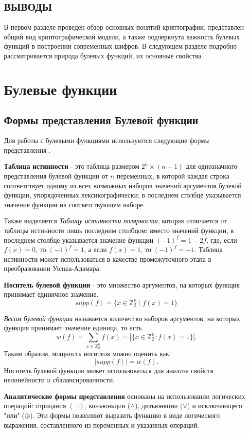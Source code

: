 \subsection*{ВЫВОДЫ}
В первом разделе проведён обзор основных понятий криптографии, представлен общий вид криптографической модели, а также подчеркнута важность булевых функций в построении современных шифров. В следующем разделе подробно рассматривается природа булевых функций, их основные свойства.
\section{Булевые функции}
\subsection{Формы представления Булевой функции}
Для работы с булевыми функциями используются следующие формы представления \cite{Pankratova}.

\textbf{Таблица истинности} - это таблица размером $2^n \times (n + 1)$ для однозначного представления булевой функции от $n$ переменных, в которой каждая строка соответствует одному из всех возможных наборов значений аргументов булевой функции, упорядоченных лексикографически; в последнем столбце указывается значение функции на соответствующем наборе.

Также выделяется \textit{Таблицу истинности полярности}, которая отличается от таблицы истинности лишь последним столбцом: вместо значений функции, в последнем столбце указывается значение функции  $(-1)^f = 1 - 2f$, где, если $f(x) = 0$, то $(-1)^f = 1$, а если $f(x) = 1$, то $(-1)^f = -1$. Таблица истинности может использоваться в качестве промежуточного этапа в преобразовании Уолша-Адамара.

\textbf{Носитель булевой функции} - это множество аргументов, на которых функция принимает единичное значение.
\[
supp(f) = \{x \in \mathbb{Z}_2^n \mid  f(x) = 1\}
\]

\textit{Весом булевой функции} называется количество наборов аргументов, на которых функция принимает значение единица, то есть 
\[
w(f) = \sum\limits_{x \in \mathbb{Z}_2^n}f(x) = \left|\{x \in \mathbb{Z}_2^n : f(x) = 1\}\right|.
\]
Таким образом, мощность носителя можно оценить как:
\[
|supp(f)| = w(f).
\]
Носитель булевой функции может использоваться для анализа свойств нелинейности и сбалансированности.

\textbf{Аналитические формы представления} основаны на использовании логических операций:  отрицания $(\neg)$, конъюнкции ($\wedge$), дизъюнкции ($\vee$) и  исключающего "или" ($\oplus$). Эти формы позволяют выразить функцию в виде логического выражения, составленного из переменных и указанных операций.

